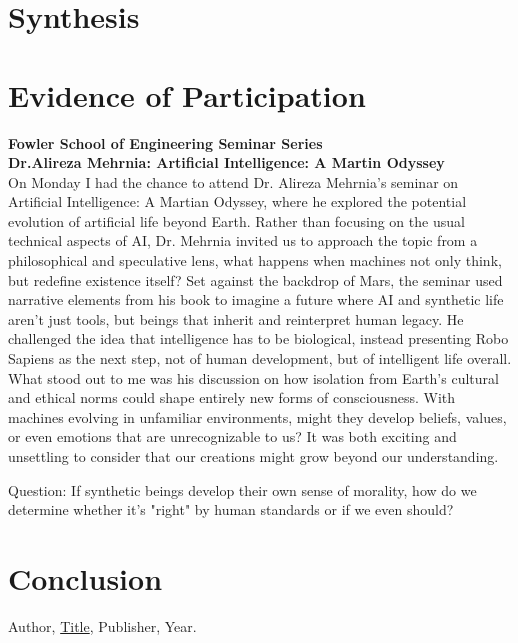 \documentclass{article}
\theoremstyle{theorem}
\theoremstyle{definition}
\theoremstyle{remark}
\begin{document}
\section{Synthesis}

\section{Evidence of Participation}
\textbf{Fowler School of Engineering Seminar Series} \\
\textbf{Dr.Alireza Mehrnia: Artificial Intelligence: A Martin Odyssey} \\
On Monday I had the chance to attend Dr. Alireza Mehrnia’s seminar on Artificial Intelligence: A Martian Odyssey, where he explored the potential evolution of artificial life beyond Earth. Rather than focusing on the usual technical aspects of AI, Dr. Mehrnia invited us to approach the topic from a philosophical and speculative lens, what happens when machines not only think, but redefine existence itself? Set against the backdrop of Mars, the seminar used narrative elements from his book to imagine a future where AI and synthetic life aren’t just tools, but beings that inherit and reinterpret human legacy. He challenged the idea that intelligence has to be biological, instead presenting Robo Sapiens as the next step, not of human development, but of intelligent life overall. What stood out to me was his discussion on how isolation from Earth’s cultural and ethical norms could shape entirely new forms of consciousness. With machines evolving in unfamiliar environments, might they develop beliefs, values, or even emotions that are unrecognizable to us? It was both exciting and unsettling to consider that our creations might grow beyond our understanding.

Question: If synthetic beings develop their own sense of morality, how do we determine whether it's "right" by human standards or if we even should?
\section{Conclusion}\label{conclusion}

\begin{thebibliography}{99}
 Author, \href{https://en.wikipedia.org/wiki/LaTeX}{Title}, Publisher, Year.
\end{thebibliography}
\end{document}
